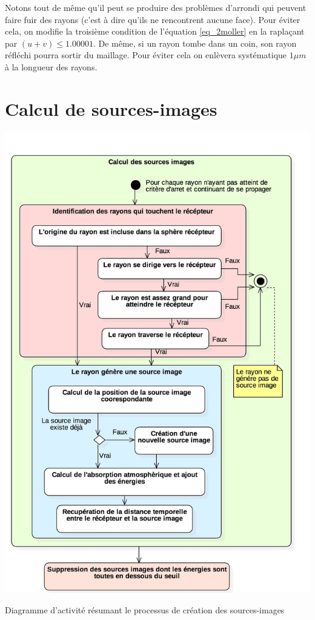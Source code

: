 Notons tout de même qu'il peut se produire des problèmes d'arrondi qui peuvent faire fuir des rayons (c'est à dire qu'ils ne rencontrent aucune face). Pour éviter cela, on modifie la troisième condition de l'équation \ref{eq_2moller} en la raplaçant par $(u+v)\leqslant1.00001$. De même, si un rayon tombe dans un coin, son rayon réfléchi pourra sortir du maillage. Pour éviter cela on enlèvera systématique $1\mu m$ à la longueur des rayons.

\section{Calcul de sources-images} \label{sect_si}

\begin{figureth}
	\includegraphics[width=0.8\linewidth]{images/DiagSi}
	\caption{Diagramme d'activité résumant le processus de création des sources-images}
	\label{DiagSi}
\end{figureth}

